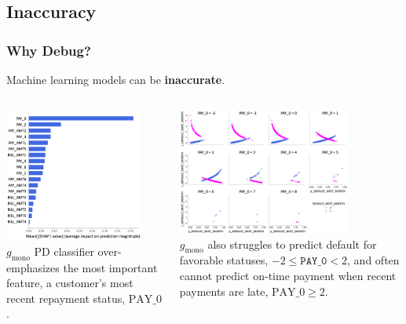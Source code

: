 \documentclass[11pt,
               aspectratio=43,
               hyperref={colorlinks}
               ]{beamer}
\begin{document}
		\subsection{Inaccuracy}

			\begin{frame}
		
				\frametitle{Why Debug?}
		
					\footnotesize{Machine learning models can be \textbf{inaccurate}.}
					\begin{columns}
				
						\centering
						\includegraphics[height=125pt]{img/global_shap.png}\\
						\vspace{5pt}
						\tiny{$g_{\text{mono}}$ PD classifier over-emphasizes the most important feature, a customer's most recent repayment status, $\text{PAY\_0}$.}

						\vspace{10pt}
						\centering
						\includegraphics[height=118pt]{img/resid.png}\\
						\vspace{5pt}
						\tiny{$g_{\text{mono}}$ also struggles to predict default for favorable statuses, $-2  \leq \texttt{PAY\_0}  < 2$, and often cannot predict on-time payment when recent payments are late, $\text{PAY\_0} \geq 2$}.
				
					\end{columns}
					\normalsize
			
			\end{frame}
	
\end{document}
